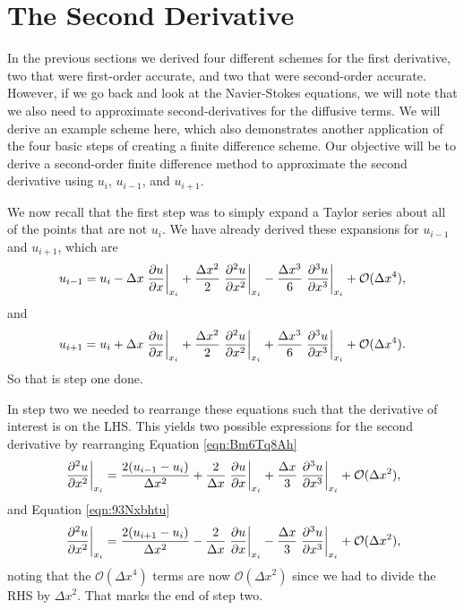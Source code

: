 \section{The Second Derivative}
In the previous sections we derived four different schemes for the first derivative, two that were first-order accurate, and two that were second-order accurate. However, if we go back and look at the Navier-Stokes equations, we will note that we also need to approximate second-derivatives for the diffusive terms. We will derive an example scheme here, which also demonstrates another application of the four basic steps of creating a finite difference scheme. Our objective will be to derive a second-order finite difference method to approximate the second derivative using $u_i$, $u_{i-1}$, and $u_{i+1}$.

We now recall that the first step was to simply expand a Taylor series about all of the points that are not $u_i$. We have already derived these expansions for $u_{i-1}$ and $u_{i+1}$, which are
\begin{equation}
	u_{i-1} = u_i - \Delta x \left.\frac{\partial u}{\partial x}\right\rvert_{x_i}^{} + \frac{\Delta x^2}{2} \left.\frac{\partial^2 u}{\partial x^2}\right\rvert_{x_i}^{} - \frac{\Delta x^3}{6} \left.\frac{\partial^3 u}{\partial x^3}\right\rvert_{x_i}^{} + \mathcal{O}(\Delta x^4),
	\label{eqn:Bm6Tq8Ah}
\end{equation}
and
\begin{equation}
	u_{i+1} = u_i + \Delta x \left.\frac{\partial u}{\partial x}\right\rvert_{x_i}^{} + \frac{\Delta x^2}{2} \left.\frac{\partial^2 u}{\partial x^2}\right\rvert_{x_i}^{} + \frac{\Delta x^3}{6} \left.\frac{\partial^3 u}{\partial x^3}\right\rvert_{x_i}^{} + \mathcal{O}(\Delta x^4).
	\label{eqn:93Nxbhtu}
\end{equation}
So that is step one done.

In step two we needed to rearrange these equations such that the derivative of interest is on the LHS. This yields two possible expressions for the second derivative by rearranging Equation \ref{eqn:Bm6Tq8Ah}
\begin{equation}
	\left.\frac{\partial^2 u}{\partial x^2}\right\rvert_{x_i}^{} = \frac{2(u_{i-1} - u_i)}{\Delta x^2} + \frac{2}{\Delta x} \left.\frac{\partial u}{\partial x}\right\rvert_{x_i}^{} + \frac{\Delta x}{3} \left.\frac{\partial^3 u}{\partial x^3}\right\rvert_{x_i}^{} + \mathcal{O}(\Delta x^2),
\end{equation}
and Equation \ref{eqn:93Nxbhtu}
\begin{equation}
	\left.\frac{\partial^2 u}{\partial x^2}\right\rvert_{x_i}^{} = \frac{2(u_{i+1} - u_i)}{\Delta x^2} - \frac{2}{\Delta x} \left.\frac{\partial u}{\partial x}\right\rvert_{x_i}^{} - \frac{\Delta x}{3} \left.\frac{\partial^3 u}{\partial x^3}\right\rvert_{x_i}^{} + \mathcal{O}(\Delta x^2),
\end{equation}
noting that the $\mathcal{O}(\Delta x^4)$ terms are now $\mathcal{O}(\Delta x^2)$ since we had to divide the RHS by $\Delta x^2$. That marks the end of step two.

